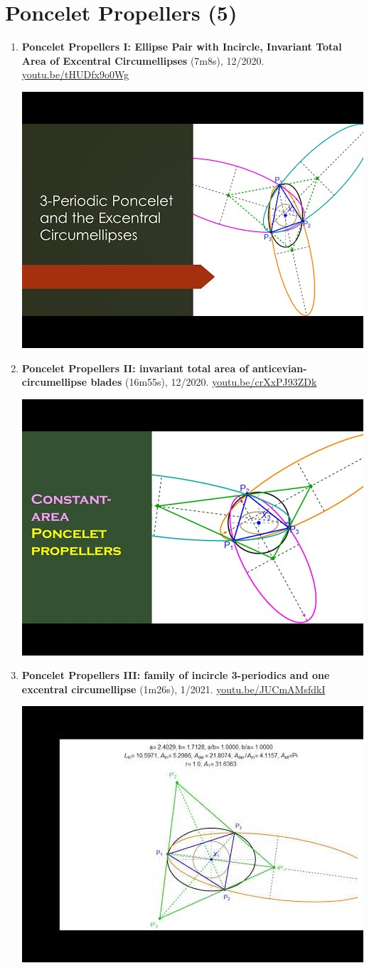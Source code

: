 \documentclass[12pt]{article}
\begin{document}
\section{Poncelet Propellers (5)}

\begin{enumerate}[resume]
\item \textbf{Poncelet Propellers I: Ellipse Pair with Incircle, Invariant Total Area of Excentral Circumellipses} (7m8s), 12/2020. \href{https://youtu.be/tHUDfx9o0Wg}{\url{youtu.be/tHUDfx9o0Wg}}
\begin{center}\includegraphics[width=.5\textwidth]{pics/tHUDfx9o0Wg.jpg}\end{center}
% 
\item \textbf{Poncelet Propellers II: invariant total area of anticevian-circumellipse blades} (16m55s), 12/2020. \href{https://youtu.be/crXxPJ93ZDk}{\url{youtu.be/crXxPJ93ZDk}}
\begin{center}\includegraphics[width=.5\textwidth]{pics/crXxPJ93ZDk.jpg}\end{center}
% 
\item \textbf{Poncelet Propellers III: family of incircle 3-periodics and one excentral circumellipse} (1m26s), 1/2021. \href{https://youtu.be/JUCmAMsfdkI}{\url{youtu.be/JUCmAMsfdkI}}
\begin{center}\includegraphics[width=.5\textwidth]{pics/JUCmAMsfdkI.jpg}\end{center}

\end{enumerate}
\end{document}
